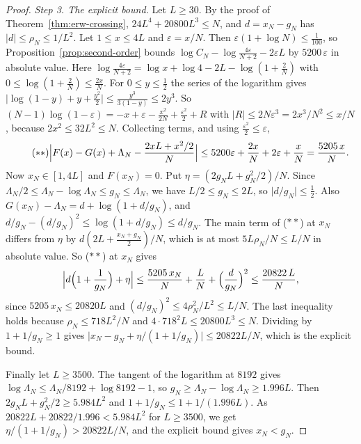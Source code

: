 \begin{proof}
\emph{Step 3. The explicit bound.} Let $L\ge30$. By the proof of
Theorem~\ref{thm:erw-crossing}, $24L^4+20800L^3\le N$, and $d=x_N-g_N$ has
$\lvert d\rvert\le\rho_N\le1/L^2$. Let $1\le x\le4L$ and $\varepsilon=x/N$. Then
$\varepsilon(1+\log N)\le\frac1{100}$, so Proposition~\ref{prop:second-order} bounds
$\log C_N-\log\frac{4\varepsilon}{N+2}-2\varepsilon L$ by $5200\,\varepsilon$ in absolute value.
Here $\log\frac{4\varepsilon}{N+2}=\log x+\log4-2L-\log(1+\frac2N)$ with
$0\le\log(1+\frac2N)\le\frac{2x}N$. For $0\le y\le\frac12$ the series of the logarithm gives
$\lvert\log(1-y)+y+\frac{y^2}2\rvert\le\frac{y^3}{3(1-y)}\le2y^3$. So
$(N-1)\log(1-\varepsilon)=-x+\varepsilon-\frac{x^2}{2N}+\frac{\varepsilon^2}2+R$ with
$\lvert R\rvert\le2N\varepsilon^3=2x^3/N^2\le x/N$, because $2x^2\le32L^2\le N$. Collecting
terms, and using $\frac{\varepsilon^2}2\le\varepsilon$,
\begin{equation}\tag{$\ast\ast$}
 \Bigl\lvert F(x)-G(x)+\Lambda_N-\frac{2xL+x^2/2}N\Bigr\rvert
 \le5200\varepsilon+\frac{2x}N+2\varepsilon+\frac xN=\frac{5205\,x}N .
\end{equation}
Now $x_N\in[1,4L]$ and $F(x_N)=0$. Put $\eta=(2g_NL+g_N^2/2)/N$. Since
$\Lambda_N/2\le\Lambda_N-\log\Lambda_N\le g_N\le\Lambda_N$, we have $L/2\le g_N\le2L$, so
$\lvert d/g_N\rvert\le\frac12$. Also $G(x_N)-\Lambda_N=d+\log(1+d/g_N)$, and
$d/g_N-(d/g_N)^2\le\log(1+d/g_N)\le d/g_N$. The main term of ($\ast\ast$) at $x_N$ differs from
$\eta$ by $d(2L+\frac{x_N+g_N}2)/N$, which is at most $5L\rho_N/N\le L/N$ in absolute value.
So ($\ast\ast$) at $x_N$ gives
\[
 \Bigl\lvert d\Bigl(1+\frac1{g_N}\Bigr)+\eta\Bigr\rvert\le\frac{5205\,x_N}N+\frac LN
 +\Bigl(\frac d{g_N}\Bigr)^2\le\frac{20822\,L}N ,
\]
since $5205\,x_N\le20820L$ and $(d/g_N)^2\le4\rho_N^2/L^2\le L/N$. The last inequality holds
because $\rho_N\le718L^2/N$ and $4\cdot718^2L\le20800L^3\le N$. Dividing by $1+1/g_N\ge1$ gives
$\lvert x_N-g_N+\eta/(1+1/g_N)\rvert\le20822L/N$, which is the explicit bound.

Finally let $L\ge3500$. The tangent of the logarithm at $8192$ gives
$\log\Lambda_N\le\Lambda_N/8192+\log8192-1$, so $g_N\ge\Lambda_N-\log\Lambda_N\ge1.996L$. Then
$2g_NL+g_N^2/2\ge5.984L^2$ and $1+1/g_N\le1+1/(1.996L)$. As
$20822L+20822/1.996<5.984L^2$ for $L\ge3500$, we get $\eta/(1+1/g_N)>20822L/N$, and the
explicit bound gives $x_N<g_N$.
\end{proof}

